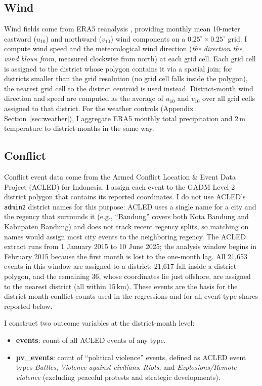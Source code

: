 \documentclass[12pt]{article}
\begin{document}
\subsection{Wind}

Wind fields come from ERA5 reanalysis \citep{hersbach2023era5}, providing monthly mean 10-meter eastward ($u_{10}$) and northward ($v_{10}$) wind components on a $0.25^{\circ}\times0.25^{\circ}$ grid. I compute wind speed and the meteorological wind direction (\emph{the direction the wind blows from}, measured clockwise from north) at each grid cell. Each grid cell is assigned to the district whose polygon contains it via a spatial join; for districts smaller than the grid resolution (no grid cell falls inside the polygon), the nearest grid cell to the district centroid is used instead. District-month wind direction and speed are computed as the average of $u_{10}$ and $v_{10}$ over all grid cells assigned to that district. For the weather controls (Appendix Section~\ref{sec:weather}), I aggregate ERA5 monthly total precipitation and 2\,m temperature to district-months in the same way.

\subsection{Conflict}

Conflict event data come from the Armed Conflict Location \& Event Data Project (ACLED) for Indonesia. I assign each event to the GADM Level-2 district polygon that contains its reported coordinates. I do not use ACLED's \texttt{admin2} district names for this purpose: ACLED uses a single name for a city and the regency that surrounds it (e.g., ``Bandung'' covers both Kota Bandung and Kabupaten Bandung) and does not track recent regency splits, so matching on names would assign most city events to the neighboring regency. The ACLED extract runs from 1 January 2015 to 10 June 2025; the analysis window begins in February 2015 because the first month is lost to the one-month lag. All 21{,}653 events in this window are assigned to a district: 21{,}617 fall inside a district polygon, and the remaining 36, whose coordinates lie just offshore, are assigned to the nearest district (all within 15\,km). These events are the basis for the district-month conflict counts used in the regressions and for all event-type shares reported below.

I construct two outcome variables at the district-month level:
\begin{itemize}
    \item \textbf{events}: count of all ACLED events of any type.
    \item \textbf{pv\_events}: count of ``political violence'' events, defined as ACLED event types \emph{Battles}, \emph{Violence against civilians}, \emph{Riots}, and \emph{Explosions/Remote violence} (excluding peaceful protests and strategic developments).
\end{itemize}
\end{document}
